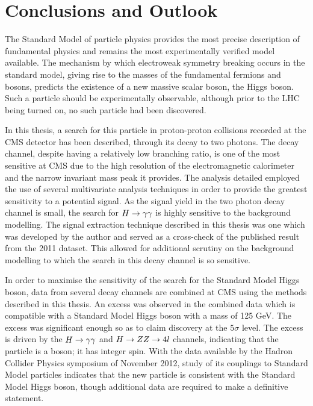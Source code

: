 \chapter{Conclusions and Outlook}
\label{chap:conclusions}

The Standard Model of particle physics provides the most precise description of 
fundamental physics and remains  the most experimentally verified
model available. The mechanism by which electroweak symmetry breaking occurs 
in the standard model, giving rise to the masses of the fundamental fermions and
bosons, predicts the existence of a new massive scalar boson, the Higgs boson.
Such a particle should be experimentally observable, although prior to the LHC being
turned on, no such particle had been discovered.

In this thesis, a search for this particle in proton-proton collisions recorded at the CMS detector 
has been described, through its decay to two photons. The decay channel, despite having a 
relatively low branching ratio, is one of the most sensitive at CMS due to the high resolution 
of the electromagnetic calorimeter and the narrow invariant mass peak it provides.
The analysis detailed employed the use of several multivariate analysis techniques
in order to provide the greatest sensitivity to a potential signal.
As the signal yield in the two photon decay channel is small, 
the search for $H\rightarrow\gamma\gamma$ is highly sensitive to the background modelling.
The signal extraction technique described in this thesis was one which was 
developed by the author and served as a cross-check of the published result from the 2011 dataset.
This allowed for additional scrutiny on the background modelling 
to which the search in this decay channel is so sensitive.

In order to maximise the sensitivity of the search for the Standard Model Higgs boson,
data from several decay channels are combined at CMS using the methods described in this thesis.
An excess was observed in the combined data which is 
compatible with a Standard Model Higgs boson with a mass of 125 GeV. The excess was 
significant enough so as to claim discovery at the $5\sigma$ level. The excess is driven 
by the $H\rightarrow\gamma\gamma$ and  $H\rightarrow ZZ \rightarrow 4l$ channels, indicating that the particle is a boson; it has integer
spin. With the data available by the Hadron Collider Physics symposium of November 2012,
study of its couplings to Standard Model particles indicates that the new particle is 
consistent with the Standard Model Higgs boson, though additional data are required to 
make a definitive statement.

